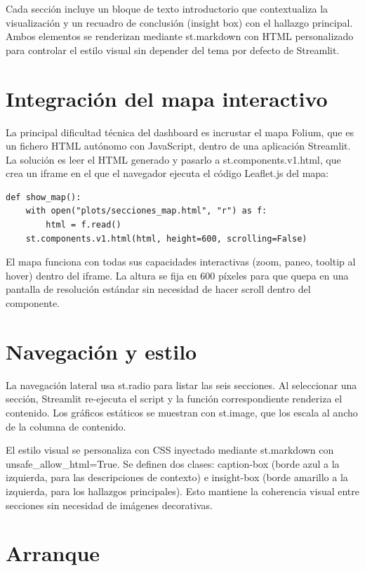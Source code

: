 \documentclass[spanish,a4paper,12pt,oneside]{extreport}
\begin{document}
Cada sección incluye un bloque de texto introductorio que contextualiza la visualización y un recuadro de conclusión (insight box) con el hallazgo principal. Ambos elementos se renderizan mediante st.markdown con HTML personalizado para controlar el estilo visual sin depender del tema por defecto de Streamlit.

\section{Integración del mapa interactivo}

La principal dificultad técnica del dashboard es incrustar el mapa Folium, que es un fichero HTML autónomo con JavaScript, dentro de una aplicación Streamlit. La solución es leer el HTML generado y pasarlo a st.components.v1.html, que crea un iframe en el que el navegador ejecuta el código Leaflet.js del mapa:

\begin{lstlisting}[caption={Incorporación del mapa Folium en Streamlit.}]
def show_map():
    with open("plots/secciones_map.html", "r") as f:
        html = f.read()
    st.components.v1.html(html, height=600, scrolling=False)
\end{lstlisting}

El mapa funciona con todas sus capacidades interactivas (zoom, paneo, tooltip al hover) dentro del iframe. La altura se fija en 600 píxeles para que quepa en una pantalla de resolución estándar sin necesidad de hacer scroll dentro del componente.

\section{Navegación y estilo}

La navegación lateral usa st.radio para listar las seis secciones. Al seleccionar una sección, Streamlit re-ejecuta el script y la función correspondiente renderiza el contenido. Los gráficos estáticos se muestran con st.image, que los escala al ancho de la columna de contenido.

El estilo visual se personaliza con CSS inyectado mediante st.markdown con unsafe\_allow\_html=True. Se definen dos clases: caption-box (borde azul a la izquierda, para las descripciones de contexto) e insight-box (borde amarillo a la izquierda, para los hallazgos principales). Esto mantiene la coherencia visual entre secciones sin necesidad de imágenes decorativas.

\section{Arranque}
\end{document}
